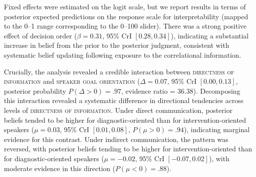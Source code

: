 \documentclass[10pt,letterpaper]{article}
\begin{document}

Fixed effects were estimated on the logit scale, but we report results in terms of posterior expected predictions on the response scale for interpretability (mapped to the 0–1 range corresponding to the 0–100 slider). %
There was a strong positive effect of decision order ($\beta = 0.31$, 95\% CrI $[0.28, 0.34]$), indicating a substantial increase in belief from the prior to the posterior judgment, consistent with systematic belief updating following exposure to the correlational information.

Crucially, the analysis revealed a credible interaction between \textsc{directness of information} and \textsc{speaker goal orientation} ($\Delta = 0.07$, 95\% CrI $[0.00, 0.13]$, posterior probability $P(\Delta > 0) = .97$, evidence ratio = 36.38). Decomposing this interaction revealed a systematic difference in directional tendencies across levels of \textsc{directness of information}. Under direct communication, posterior beliefs tended to be higher for diagnostic-oriented than for intervention-oriented speakers ($\mu = 0.03$, 95\% CrI $[0.01, 0.08]$, $P(\mu > 0) = .94$), indicating marginal evidence for this contrast. Under indirect communication, the pattern was reversed, with posterior beliefs tending to be higher for intervention-oriented than for diagnostic-oriented speakers ($\mu = -0.02$, 95\% CrI $[-0.07, 0.02]$), with moderate evidence in this direction ($P(\mu < 0) = .88$).
\end{document}
